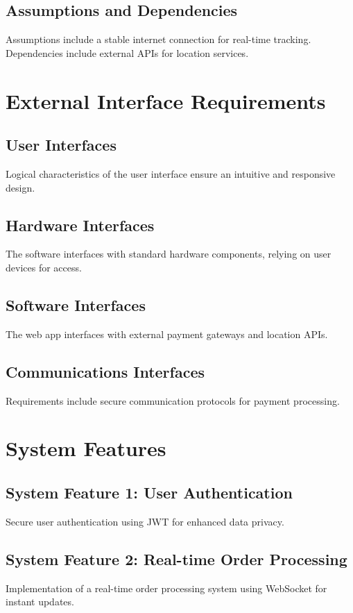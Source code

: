 \documentclass{article}
\begin{document}
\subsection{Assumptions and Dependencies}
Assumptions include a stable internet connection for real-time tracking. Dependencies include external APIs for location services.

\newpage
\section{External Interface Requirements}
\subsection{User Interfaces}
Logical characteristics of the user interface ensure an intuitive and responsive design.

\subsection{Hardware Interfaces}
The software interfaces with standard hardware components, relying on user devices for access.

\subsection{Software Interfaces}
The web app interfaces with external payment gateways and location APIs.

\subsection{Communications Interfaces}
Requirements include secure communication protocols for payment processing.

\newpage
\section{System Features}
\subsection{System Feature 1: User Authentication}
Secure user authentication using JWT for enhanced data privacy.

\subsection{System Feature 2: Real-time Order Processing}
Implementation of a real-time order processing system using WebSocket for instant updates.
\end{document}
